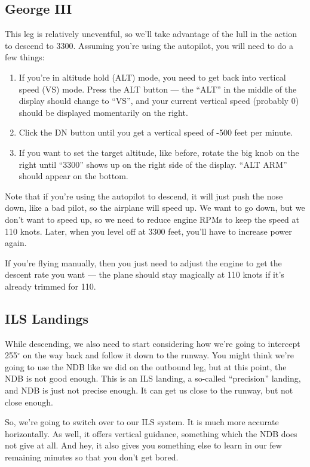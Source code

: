 \subsection{George III}

This leg is relatively uneventful, so we'll take advantage of the lull
in the action to descend to 3300.  Assuming you're using the
autopilot, you will need to do a few things:

\begin{enumerate}
\item If you're in altitude hold (ALT) mode, you need to get back into
  vertical speed (VS) mode.  Press the ALT button --- the ``ALT'' in
  the middle of the display should change to ``VS'', and your current
  vertical speed (probably 0) should be displayed momentarily on the
  right.
\item Click the DN button until you get a vertical speed of -500 feet
  per minute.
\item If you want to set the target altitude, like before, rotate the
  big knob on the right until ``3300'' shows up on the right side of
  the display.  ``ALT ARM'' should appear on the bottom.
\end{enumerate}

Note that if you're using the autopilot to descend, it will just push
the nose down, like a bad pilot, so the airplane will speed up.  We
want to go down, but we don't want to speed up, so we need to reduce
engine RPMs to keep the speed at 110 knots.  Later, when you level off
at 3300 feet, you'll have to increase power again.

If you're flying manually, then you just need to adjust the engine to
get the descent rate you want --- the plane should stay magically at
110 knots if it's already trimmed for 110.

\subsection{ILS Landings}

While descending, we also need to start considering how we're going to
intercept 255$^\circ$ on the way back and follow it down to the
runway.  You might think we're going to use the NDB like we did on the
outbound leg, but at this point, the NDB is not good enough.  This is
an ILS landing, a so-called ``precision'' landing, and NDB is just not
precise enough.  It can get us close to the runway, but not close
enough.

So, we're going to switch over to our ILS system.  It is much more
accurate horizontally.  As well, it offers vertical guidance,
something which the NDB does not give at all.  And hey, it also gives
you something else to learn in our few remaining minutes so that you
don't get bored.

